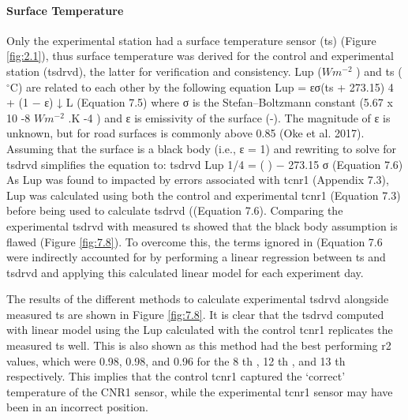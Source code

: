 \documentclass[final,3p,times,authoryear]{elsarticle}
\begin{document}
\paragraph{Surface Temperature}\label{sec:appendix7.4.2}

Only the experimental station had a surface temperature sensor (\gls{ts}) (Figure \ref{fig:2.1}), thus
surface temperature was derived for the control and experimental station (\gls{tsdrvd}), the
latter for verification and consistency. \gls{Lup} ($Wm^{-2}$ ) and \gls{ts} ($^{\circ}$C) are related to each other
by the following equation
\gls{Lup} = εσ(\gls{ts} + 273.15) 4 + (1 − ε) ↓ L
(Equation 7.5)
where σ is the Stefan–Boltzmann constant (5.67 x 10 -8 $Wm^{-2}$ .K -4 ) and ε is emissivity of
the surface (-). The magnitude of ε is unknown, but for road surfaces is commonly
above 0.85 (Oke et al. 2017). Assuming that the surface is a black body (i.e., ε = 1) and
rewriting to solve for \gls{tsdrvd} simplifies the equation to:
\gls{tsdrvd}
\gls{Lup} 1/4
= ( ) − 273.15
σ
(Equation 7.6)
As \gls{Lup} was found to impacted by errors associated with \gls{tcnr1} (Appendix 7.3), \gls{Lup} was
calculated using both the control and experimental \gls{tcnr1} (Equation 7.3) before being
used to calculate \gls{tsdrvd} ((Equation 7.6). Comparing the experimental \gls{tsdrvd} with
measured \gls{ts} showed that the black body assumption is flawed (Figure \ref{fig:7.8}). To
overcome this, the terms ignored in (Equation 7.6 were indirectly accounted for by
performing a linear regression between \gls{ts} and \gls{tsdrvd} and applying this calculated linear
model for each experiment day.

The results of the different methods to calculate experimental \gls{tsdrvd} alongside measured
\gls{ts} are shown in Figure \ref{fig:7.8}. It is clear that the \gls{tsdrvd} computed with linear model using
the \gls{Lup} calculated with the control \gls{tcnr1} replicates the measured \gls{ts} well. This is also
shown as this method had the best performing \gls{r2} values, which were 0.98, 0.98, and
0.96 for the 8 th , 12 th , and 13 th respectively. This implies that the control \gls{tcnr1} captured
the `correct' temperature of the CNR1 sensor, while the experimental \gls{tcnr1} sensor may
have been in an incorrect position.
\end{document}
